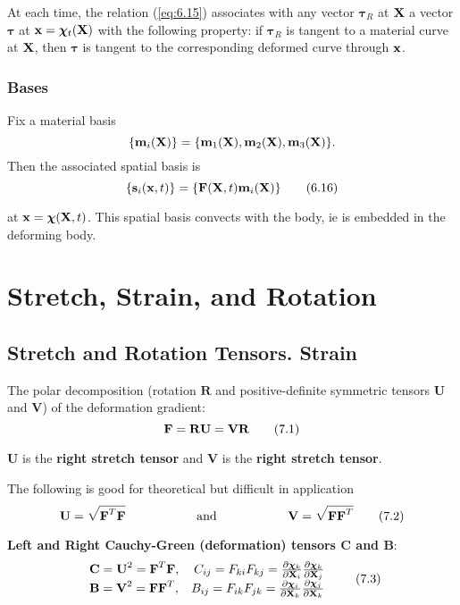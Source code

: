 \documentclass{article}
\newcommand{\Chi}{\boldsymbol{\chi}}
\begin{document}
\begin{theorem}
	At each time, the relation (\ref{eq:6.15}) associates with any vector $\boldsymbol{\tau}_R$ at $\textbf{X}$ a vector $\boldsymbol{\tau}$ at $\x = \Chi_t(\X)$ with the following property: if $\boldsymbol{\tau}_R$ is tangent to a material curve at $\textbf{X}$, then $\boldsymbol{\tau}$ is tangent to the corresponding deformed curve through $\textbf{x}$.
\end{theorem}

\subsubsection{Bases}
Fix a material basis
$$\lbrace \textbf{m}_i(\textbf{X})\rbrace = \lbrace \textbf{m}_1(\textbf{X}),\textbf{m}_2(\textbf{X}),\textbf{m}_3(\textbf{X}) \rbrace.$$
Then the associated spatial basis is
\[
\lbrace \textbf{s}_i(\textbf{x},t)\rbrace = \lbrace \textbf{F}(\textbf{X},t)\textbf{m}_i(\textbf{X})\rbrace \tag{6.16}\label{eq:6.16}
\]

at $\x = \Chi(\X, t)$.
This spatial basis convects with the body, ie is embedded in the deforming body.

\section{Stretch, Strain, and Rotation}
\subsection{Stretch and Rotation Tensors. Strain}
The polar decomposition (rotation $\textbf{R}$ and positive-definite symmetric tensors \textbf{U} and \textbf{V}) of the deformation gradient:
\[
\textbf{F} = \textbf{R}\textbf{U} = \textbf{V}\textbf{R} \tag{7.1}\label{eq:7.10}
\]

\textbf{U} is the \textbf{right stretch tensor} and \textbf{V} is the \textbf{right stretch tensor}.

The following is good for theoretical but difficult in application
\[
\centering
\textbf{U} = \sqrt{\F^T\F} \hspace{2cm} \text{and} \hspace{2cm}\textbf{V} = \sqrt{\F\F^T} \tag{7.2} \label{eq:7.2}
\]

\textbf{Left and Right Cauchy-Green (deformation) tensors C and B}:
\[
\begin{array}{lr}
\textbf{C} = \textbf{U}^2 = \F^T\F,  &  C_{ij} = F_{ki}F_{kj} = \frac{\partial \Chi_k}{\partial\X_i}\frac{\partial\Chi_k}{\partial\X_j}\\

\textbf{B} = \textbf{V}^2 = \F\F^T,  &  B_{ij} = F_{ik}F_{jk} = \frac{\partial \Chi_i}{\partial\X_k}\frac{\partial\Chi_j}{\partial\X_k}
\end{array} \tag{7.3}\label{eq:7.3}
\]
\end{document}
